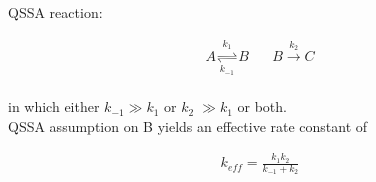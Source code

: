 \documentclass[24pt]{article}
\begin{document}
\title{}
\author{}
\date{}
\maketitle

\huge

\noindent QSSA reaction:

\begin{align*}
  A \underset{k_{-1}}{\stackrel{k_1}{\rightleftharpoons}} B \; \; \; \; \; \; B \stackrel{k_2}{\rightarrow} C
\end{align*}
\\
in which either $k_{-1} \gg k_1$ or $k_2 \; \gg k_1$ or both. \\

\noindent QSSA assumption on B yields an effective rate constant of 

\begin{align*}
  k_{eff} = \frac{k_1 k_2}{k_{-1} + k_2}
\end{align*}
\end{document}
